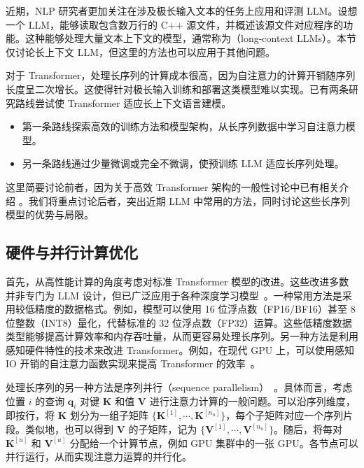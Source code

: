 近期，NLP 研究者更加关注在涉及极长输入文本的任务上应用和评测 LLM。设想一个 LLM，能够读取包含数万行的 C++ 源文件，并概述该源文件对应程序的功能。这种能够处理大量文本上下文的模型，通常称为（long-context LLMs）。本节仅讨论长上下文 LLM，但这里的方法也可以应用于其他问题。

对于 Transformer，处理长序列的计算成本很高，因为自注意力的计算开销随序列长度呈二次增长。这使得针对极长输入训练和部署这类模型难以实现。已有两条研究路线尝试使 Transformer 适应长上下文语言建模。

\begin{itemize}
\item \vspace{0.5em} 第一条路线探索高效的训练方法和模型架构，从长序列数据中学习自注意力模型。
\item \vspace{0.3em} 另一条路线通过少量微调或完全不微调，使预训练 LLM 适应长序列处理。
\end{itemize}
\vspace{0.5em}

这里简要讨论前者，因为关于高效 Transformer 架构的一般性讨论中已有相关介绍 \cite{Tay-etal:2020efficient,xiao-and-zhu:2023introduction}。我们将重点讨论后者，突出近期 LLM 中常用的方法，同时讨论这些长序列模型的优势与局限。

\subsection{硬件与并行计算优化}

\noindent 首先，从高性能计算的角度考虑对标准 Transformer 模型的改进。这些改进多数并非专门为 LLM 设计，但已广泛应用于各种深度学习模型~\cite{kim-etal:2023full}。一种常用方法是采用较低精度的数据格式。例如，模型可以使用 16 位浮点数（FP16/BF16）甚至 8 位整数（INT8）量化，代替标准的 32 位浮点数（FP32）运算。这些低精度数据类型能够提高计算效率和内存吞吐量，从而更容易处理长序列。另一种方法是利用感知硬件特性的技术来改进 Transformer。例如，在现代 GPU 上，可以使用感知 IO 开销的自注意力函数实现来提高 Transformer 的效率~\cite{dao-etal:2022flashattention,kwon-etal:2023efficient}。

处理长序列的另一种方法是序列并行（sequence parallelism）~\cite{li-etal:2023sequence,korthikanti-etal:2023reducing}。具体而言，考虑位置 $i$ 的查询 $\mathbf{q}_i$ 对键 $\mathbf{K}$ 和值 $\mathbf{V}$ 进行注意力计算的一般问题。可以沿序列维度，即按行，将 $\mathbf{K}$ 划分为一组子矩阵 $\{\mathbf{K}^{[1]},\cdots,\mathbf{K}^{[n_u]}\}$，每个子矩阵对应一个序列片段。类似地，也可以得到 $\mathbf{V}$ 的子矩阵，记为 $\{\mathbf{V}^{[1]},\cdots,\mathbf{V}^{[n_u]}\}$。随后，将每对 $\mathbf{K}^{[u]}$ 和 $\mathbf{V}^{[u]}$ 分配给一个计算节点，例如 GPU 集群中的一张 GPU。各节点可以并行运行，从而实现注意力运算的并行化。

